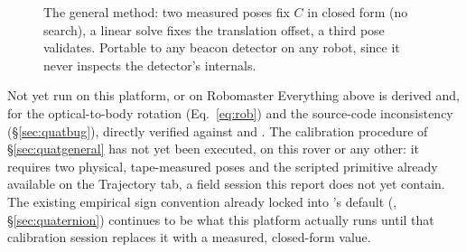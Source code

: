 \begin{figure}[htbp]
\centering
{}
\caption[General quaternion calibration procedure]{The general method: two
measured poses fix $C$ in closed form (no search), a linear solve fixes the
translation offset, a third pose validates. Portable to any beacon detector
on any robot, since it never inspects the detector's internals.}
\label{fig:quatcalib}
\end{figure}

\begin{trapbox}{Not yet run on this platform, or on Robomaster}
Everything above is derived and, for the optical-to-body rotation
(Eq.~\ref{eq:rob}) and the source-code inconsistency (\S\ref{sec:quatbug}),
directly verified against  and .
The calibration procedure of \S\ref{sec:quatgeneral} has not yet been
executed, on this rover or any other: it requires two physical, tape-measured
poses and the \code{90\textdegree} scripted primitive already available on
the Trajectory tab, a field session this report does not yet contain. The
existing empirical sign convention already locked into
's  default
(, \S\ref{sec:quaternion}) continues to be what this platform
actually runs until that calibration session replaces it with a measured,
closed-form value.
\end{trapbox}

